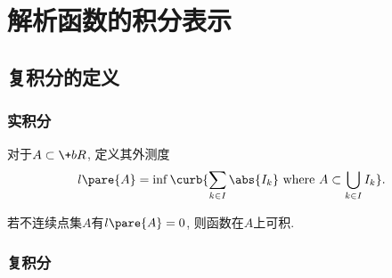 \documentclass[../ComplexVariable.tex]{subfiles}
\begin{document}
\section{解析函数的积分表示} %
\label{sec:解析函数的积分表示}

\subsection{复积分的定义} %
\label{sub:复积分的定义}

\subsubsection{实积分} %
\label{ssub:实积分}

\begin{definition}[外测度]
    对于$A\subset \+bR$, 定义其外测度
    \[ l\pare{A} = \inf\curb{\sum_{k\in I} \abs{I_k}\ \mathrm{where}\ A\subset \bigcup_{k\in I} I_k}. \]
\end{definition}
若不连续点集$A$有$l\pare{A} = 0$, 则函数在$A$上可积.


\subsubsection{复积分} %
\label{ssub:复积分}
\end{document}
